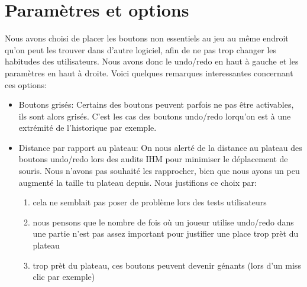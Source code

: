 \documentclass{report}
\begin{document}
\section{Paramètres et options}
Nous avons choisi de placer les boutons non essentiels au jeu au même endroit qu'on peut les trouver dans d'autre logiciel, afin de ne pas trop changer les habitudes des utilisateurs. Nous avons donc le undo/redo en haut à gauche et les paramètres en haut à droite. Voici quelques remarques interessantes concernant ces options:

\begin{itemize}
\item Boutons grisés: Certains des boutons peuvent parfois ne pas être activables, ils sont alors grisés. C'est les cas des boutons undo/redo lorqu'on est à une extrémité de l'historique par exemple.

\item Distance par rapport au plateau: On nous alerté de la distance au plateau des boutons undo/redo lors des audits IHM pour minimiser le déplacement de souris. Nous n'avons pas souhaité les rapprocher, bien que nous ayons un peu augmenté la taille tu plateau depuis. Nous justifions ce choix par:
  \begin {enumerate}
  \item cela ne semblait pas poser de problème lors des tests utilisateurs
  \item nous pensons que le nombre de fois où un joueur utilise undo/redo dans une partie n'est pas assez important pour justifier une place trop prèt du plateau
  \item trop prèt du plateau, ces boutons peuvent devenir génants (lors d'un miss clic par exemple)
  \end{enumerate}


\end{itemize}
\end{document}
